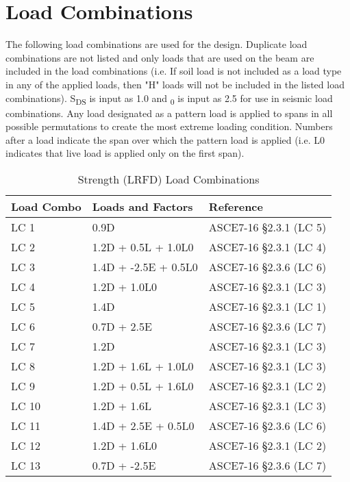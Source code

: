 \documentclass[12pt, fleqn]{article}
\begin{document}
\section{Load Combinations}
The following load combinations are used for the design. Duplicate load combinations are not listed and only loads that are used on the beam are included in the load combinations (i.e. If soil load is not included as a load type in any of the applied loads, then "H" loads will not be included in the listed load combinations). S\textsubscript{DS} is input as 1.0 and \textOmega\textsubscript{0} is input as 2.5 for use in seismic load combinations. Any load designated as a pattern load is applied to spans in all possible permutations to create the most extreme loading condition. Numbers after a load indicate the span over which the pattern load is applied (i.e. L0 indicates that live load is applied only on the first span).
\begin{table}[H]
\caption{Strength (LRFD) Load Combinations}
\centering
\begin{tabular}{l l l}
\hline
Load Combo & Loads and Factors & Reference\\
\hline
LC 1 & 0.9D & ASCE7-16 \S2.3.1 (LC 5)\\
LC 2 & 1.2D + 0.5L\textsubscriptr0 + 1.0L0 & ASCE7-16 \S2.3.1 (LC 4)\\
LC 3 & 1.4D + -2.5E + 0.5L0 & ASCE7-16 \S2.3.6 (LC 6)\\
LC 4 & 1.2D + 1.0L0 & ASCE7-16 \S2.3.1 (LC 3)\\
LC 5 & 1.4D & ASCE7-16 \S2.3.1 (LC 1)\\
LC 6 & 0.7D + 2.5E & ASCE7-16 \S2.3.6 (LC 7)\\
LC 7 & 1.2D & ASCE7-16 \S2.3.1 (LC 3)\\
LC 8 & 1.2D + 1.6L\textsubscriptr0 + 1.0L0 & ASCE7-16 \S2.3.1 (LC 3)\\
LC 9 & 1.2D + 0.5L\textsubscriptr0 + 1.6L0 & ASCE7-16 \S2.3.1 (LC 2)\\
LC 10 & 1.2D + 1.6L\textsubscriptr0 & ASCE7-16 \S2.3.1 (LC 3)\\
LC 11 & 1.4D + 2.5E + 0.5L0 & ASCE7-16 \S2.3.6 (LC 6)\\
LC 12 & 1.2D + 1.6L0 & ASCE7-16 \S2.3.1 (LC 2)\\
LC 13 & 0.7D + -2.5E & ASCE7-16 \S2.3.6 (LC 7)\\
\hline
\end{tabular}
\end{table}
\end{document}
